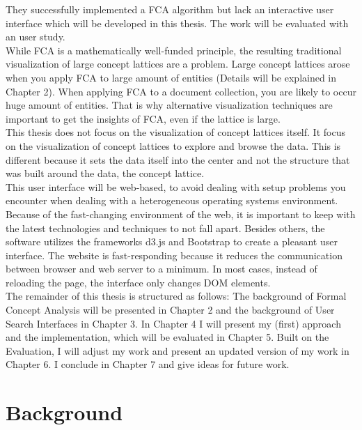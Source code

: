 \documentclass[11pt]{report}
\begin{document}
 They successfully implemented a FCA algorithm but lack an interactive user interface which will be developed in this thesis. The work will be evaluated with an user study. \\
   
 While FCA is a mathematically well-funded principle, the resulting traditional visualization of large concept lattices are a problem. Large concept lattices arose when you apply FCA to large amount of entities (Details will be explained in Chapter 2). When applying FCA to a document collection, you are likely to occur huge amount of entities. That is why alternative visualization techniques are important to get the insights of FCA, even if the lattice is large. \\
  
 This thesis does not focus on the visualization of concept lattices itself. It focus on the visualization of concept lattices to explore and browse the data. This is different because it sets the data itself into the center and not the structure that was built around the data, the concept lattice.\\
 
This user interface will be web-based, to avoid dealing with setup problems you encounter when dealing with a heterogeneous operating systems environment. Because of the fast-changing environment of the web, it is important to keep with the latest technologies and techniques to not fall apart. Besides others, the software utilizes the frameworks d3.js and Bootstrap to create a pleasant user interface. The website is fast-responding because it reduces the communication between browser and web server to a minimum. In most cases, instead of reloading the page, the interface only changes DOM elements. \\
    
 The remainder of this thesis is structured as follows: The background of Formal Concept Analysis will be presented in Chapter 2 and the background of User Search Interfaces in Chapter 3. In Chapter 4 I will present my (first) approach and the implementation, which will be evaluated in Chapter 5. Built on the Evaluation, I will adjust my work and present an updated version of my work in Chapter 6. I conclude in Chapter 7 and give ideas for future work.
 
\chapter{Background}
\end{document}
